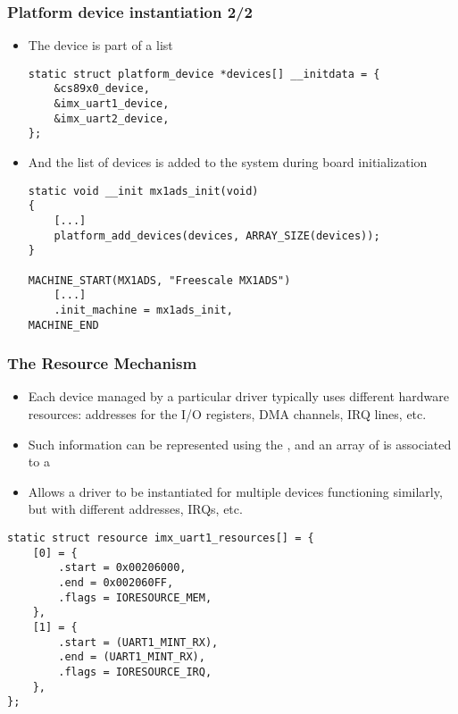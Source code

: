 \begin{frame}[fragile]
  \frametitle{Platform device instantiation 2/2}
  \begin{itemize}
  \item The device is part of a list
  \begin{verbatim}
static struct platform_device *devices[] __initdata = {
    &cs89x0_device,
    &imx_uart1_device,
    &imx_uart2_device,
};
  \end{verbatim}
  \item And the list of devices is added to the system during
    board initialization
  \begin{verbatim}
static void __init mx1ads_init(void)
{
    [...]
    platform_add_devices(devices, ARRAY_SIZE(devices));
}

MACHINE_START(MX1ADS, "Freescale MX1ADS")
    [...]
    .init_machine = mx1ads_init,
MACHINE_END
  \end{verbatim}
  \end{itemize}
\end{frame}

\begin{frame}[fragile]
  \frametitle{The Resource Mechanism}
  \begin{itemize}
  \item Each device managed by a particular driver typically uses
    different hardware resources: addresses for the I/O registers, DMA
    channels, IRQ lines, etc.
  \item Such information can be represented using the
    , and an array of  is
    associated to a 
  \item Allows a driver to be instantiated for multiple devices
    functioning similarly, but with different addresses, IRQs, etc.
  \end{itemize}
  \begin{verbatim}
static struct resource imx_uart1_resources[] = {
    [0] = {
        .start = 0x00206000,
        .end = 0x002060FF,
        .flags = IORESOURCE_MEM,
    },
    [1] = {
        .start = (UART1_MINT_RX),
        .end = (UART1_MINT_RX),
        .flags = IORESOURCE_IRQ,
    },
};
  \end{verbatim}
\end{frame}

